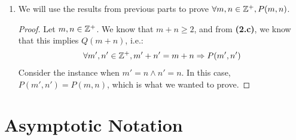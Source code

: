 \documentclass[12pt]{article}
\theoremstyle{definition}
\begin{document}
\begin{enumerate}
\begin{proof}
\begin{itemize}
                In this case, the following statements are $\True$ using the induction hypothesis:
                \begin{align*}
                    m_2 + (n_2 - 1) = t_1 \implies P(m_1, n_1 - 1) \tag{$m_2, (n_2-1) \in \Z^+$}\\
                    (m_2 - 1) + n_2 = t_1 \implies P(m_2, n_2 - 1) \tag{$(m_2-1), n_2 \in \Z^+$} \\
                \end{align*}
                Since both of these expressions are $\True$ in this case, by \textbf{(2.a.iii)}, we can conclude that:
                \begin{align*}
                    P(m_2 - 1, n_2) \land P(m_2, n_2 - 1) \implies P(m_2, n_2)
                \end{align*}
            \end{itemize}
        \end{proof}
    \item We will use the results from previous parts to prove $\forall m, n \in \mathbb Z^+, P(m, n)$.
        \begin{proof}
            Let $m, n \in \mathbb Z^+$.
            We know that $m + n \geq 2$, and from \textbf{(2.c)}, we know that this implies $Q(m+n)$, i.e.:
            \begin{align*}
                \forall m', n' \in \mathbb Z^+, m' + n' = m + n \mathrel{\Rightarrow} P(m', n')
            \end{align*} 
            Consider the instance when $m' = n \land n' = n$. In this case, $P(m', n') = P(m, n)$, which is what we wanted to prove.
        \end{proof}
\end{enumerate}

\newpage
\section{Asymptotic Notation}
\newcommand{\nn}{\ceil{\frac{1 + \sqrt{1 + 4k}}{2}}}
\newcommand{\nnf}{\frac{1 + \sqrt{1 + 4k}}{2}}
\newcommand{\nnfs}{\frac{1 - \sqrt{1 + 4k}}{2}}
\newcommand{\nnsq}{\sqrt{1 + 4k}}
\newcommand{\nnsqs}{\sqrt{1 - 4k}}
\end{document}
